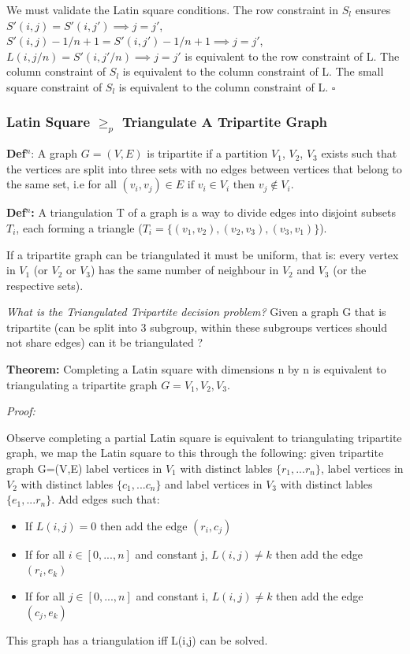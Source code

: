 \documentclass[a4paper,12pt]{article}
\begin{document}
We must validate the Latin square conditions. The row constraint in $S_l$ ensures $S'(i,j)=S'(i,j') \implies j=j'$, $S'(i,j)-1/n+1=S'(i,j')-1/n+1 \implies j=j'$, $L(i,j/n)=S'(i,j'/n) \implies j=j'$  is equivalent to the row constraint of L. The column constraint of $S_l$ is equivalent to the column constraint of L. The small square constraint of $S_l$ is equivalent to the column constraint of L. $\square$




\subsubsection{Latin Square $\geq_p$ Triangulate A Tripartite Graph}

\textbf{Def$^n$}: A graph $G=(V,E)$ is tripartite if a partition $V_1$, $V_2$, $V_3$ exists such that the vertices are split into three sets with no edges between vertices that belong to the same set, i.e for all $(v_i,v_j) \in E\text{ if } v_i \in V_i\text{ then }v_j \not\in V_i $.

\textbf{Def$^n$:} A triangulation T of a graph is a way to divide edges into disjoint subsets $T_i$, each forming a triangle ($T_i=\{(v_{1}, v_{2}),(v_{2}, v_{3}),(v_{3},v_{1})\}$).

If a tripartite graph can be triangulated it must be uniform, that is: every vertex in $V_1$ (or $V_2$ or $V_3$) has the same number of neighbour in $V_2$ and $V_3$ (or the respective sets).

\textit{What is the Triangulated Tripartite decision problem?} Given a graph G that is tripartite (can be split into 3 subgroup, within these subgroups vertices should not share edges) can it be triangulated ?

\textbf{Theorem:} Completing a Latin square with dimensions n by n is equivalent to triangulating a tripartite graph $G= V_1, V_2, V_3$.

\textit{Proof:} 

Observe completing a partial Latin square is equivalent to triangulating tripartite graph, we map the Latin square to this through the following: 
given tripartite graph G=(V,E) label vertices in $V_1$ with distinct lables $\{r_1,...r_n\}$, label vertices in $V_2$ with distinct lables $\{c_1,...c_n\}$ and label vertices in $V_3$ with distinct lables $\{e_1,...r_n\}$. Add edges such that:
\begin{itemize}
\item{If $L(i,j) = 0$ then add the edge $(r_i,c_j)$ }
\item{If for all $i \in [0,...,n]$ and constant j, $L(i,j) \neq k$ then add the edge $(r_i,e_k)$}
\item{If for all $j \in [0,...,n]$ and constant i, $L(i,j) \neq k$ then add the edge $(c_j,e_k)$}
\end{itemize}
This graph has a triangulation iff L(i,j) can be solved.
\end{document}
